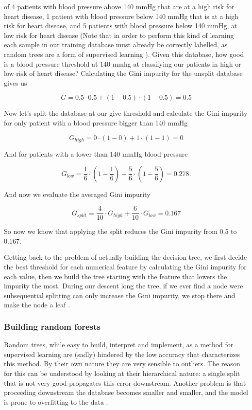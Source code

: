 \documentclass[a4paper]{report}
\begin{document}
of 4 patients with blood pressure above 140 mmHg that are at a high risk for heart disease, 1 patient with blood pressure below 140 mmHg that is at a high risk for heart disease, and 5 patients with blood pressure below 140 mmHg, at low risk for heart disease (Note that in order to perform this kind of learning each sample in our training database must already be correctly labelled, as random trees are a form of supervised learning ).
Given this database, how good is a blood pressure threshold at 140 mmhg at classifying our patients in high or low risk of heart disease?
Calculating the Gini impurity for the unsplit database gives us

\begin{equation}
    G = 0.5 \cdot 0.5 + (1-0.5) \cdot (1-0.5) = 0.5
\end{equation}

Now let's split the database at our give threshold and calculate the Gini impurity for only patient with a blood pressure bigger than 140 mmHg

\begin{equation}
    G_{high} = 0 \cdot (1 -0) + 1 \cdot (1-1) = 0
\end{equation}

And for patients with a lower than 140 mmHg blood pressure

\begin{equation}
    G_{low} = \frac{1}{6} \cdot (1 - \frac{1}{6}) + \frac{5}{6} \cdot (1- \frac{5}{6}) = 0.278.
\end{equation}

And now we evaluate the averaged Gini impurity

\begin{equation}
    G_{split} = \frac{4}{10} \cdot G_{high} + \frac{6}{10} \cdot G_{low} = 0.167
\end{equation}

So now we know that applying the split reduces the Gini impurity from 0.5 to 0.167.

Getting back to the problem of actually building the decision tree, we first decide the best threshold for each numerical feature by calculating the Gini impurity for each value, then we build the tree starting with the feature that lowers the impurity the most.
During our descent long the tree, if we ever find a node were subsequential splitting can only increase the Gini impurity, we stop there and make the node a leaf \cite{breiman2001random}.

\subsubsection{Building random forests}
Random trees, while easy to build, interpret and implement, as a method for supervised learning are (sadly) hindered by the low accuracy that characterizes this method.
By their own nature they are very sensible to outliers. The reason for this can be understood by looking at their hierarchical nature: a single split that is not very good propagates this error downstream.
Another problem is that proceeding downstream the database becomes smaller and smaller, and the model is prone to overfitting to the data \cite{bramer2007avoiding}.
\end{document}
